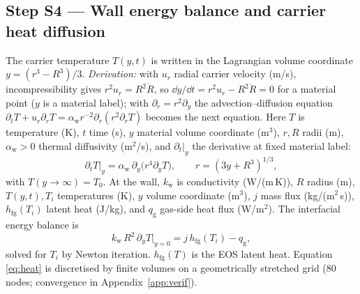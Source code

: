 \subsection{Step S4 --- Wall energy balance and carrier heat diffusion}
The carrier temperature $T(y,t)$ is written in the Lagrangian volume coordinate $y=(r^3-R^3)/3$.
\emph{Derivation:} with $u_r$ radial carrier velocity (m/s), incompressibility gives
$r^2u_r=R^2\dot R$, so $\dd y/\dd t=r^2u_r-R^2\dot R=0$ for a
material point ($y$ is a material label); with $\partial_r=r^2\partial_y$ the advection--diffusion equation
$\partial_tT+u_r\partial_rT=\alpha_{\mathrm w}r^{-2}\partial_r(r^2\partial_rT)$ becomes the next
equation. Here $T$ is temperature (K), $t$ time (s), $y$ material volume coordinate (m$^3$),
$r,R$ radii (m), $\alpha_{\mathrm w}>0$ thermal diffusivity (m$^2$/s), and
$\partial_t|_y$ the derivative at fixed material label:
\begin{equation}
\partial_tT\big|_y=\alpha_{\mathrm w}\,\partial_y\bigl(r^4\partial_yT\bigr),\qquad r=(3y+R^3)^{1/3},\label{eq:heat}
\end{equation}
with $T(y\to\infty)=T_0$. At the wall, $k_{\mathrm w}$ is conductivity (W/(m\,K)),
$R$ radius (m), $T(y,t),T_i$ temperatures (K), $y$ volume coordinate (m$^3$),
$j$ mass flux (kg/(m$^2$\,s)), $h_{\mathrm{fg}}(T_i)$ latent heat (J/kg), and $q_{\mathrm g}$ gas-side heat flux
(W/m$^2$). The interfacial energy balance is
\begin{equation}
k_{\mathrm w}\,R^2\,\partial_yT\big|_{y=0}=j\,h_{\mathrm{fg}}(T_i)-q_{\mathrm g},\label{eq:wallbalance}
\end{equation}
solved for $T_i$ by Newton iteration. $h_{\mathrm{fg}}(T)$ is the EOS latent heat. Equation \eqref{eq:heat} is
discretised by finite volumes on a geometrically stretched grid (80 nodes; convergence in
Appendix~\ref{app:verif}).

